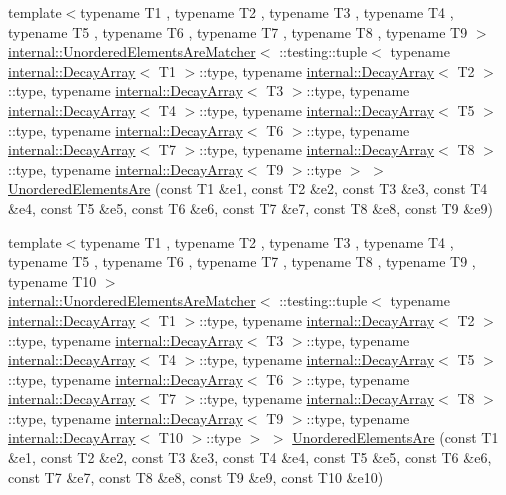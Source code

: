 \begin{DoxyCompactItemize}
\item 
{\footnotesize template$<$typename T1 , typename T2 , typename T3 , typename T4 , typename T5 , typename T6 , typename T7 , typename T8 , typename T9 $>$ }\\\hyperlink{classtesting_1_1internal_1_1UnorderedElementsAreMatcher}{internal\+::\+Unordered\+Elements\+Are\+Matcher}$<$ \+::testing\+::tuple$<$ typename \hyperlink{structtesting_1_1internal_1_1DecayArray}{internal\+::\+Decay\+Array}$<$ T1 $>$\+::type, typename \hyperlink{structtesting_1_1internal_1_1DecayArray}{internal\+::\+Decay\+Array}$<$ T2 $>$\+::type, typename \hyperlink{structtesting_1_1internal_1_1DecayArray}{internal\+::\+Decay\+Array}$<$ T3 $>$\+::type, typename \hyperlink{structtesting_1_1internal_1_1DecayArray}{internal\+::\+Decay\+Array}$<$ T4 $>$\+::type, typename \hyperlink{structtesting_1_1internal_1_1DecayArray}{internal\+::\+Decay\+Array}$<$ T5 $>$\+::type, typename \hyperlink{structtesting_1_1internal_1_1DecayArray}{internal\+::\+Decay\+Array}$<$ T6 $>$\+::type, typename \hyperlink{structtesting_1_1internal_1_1DecayArray}{internal\+::\+Decay\+Array}$<$ T7 $>$\+::type, typename \hyperlink{structtesting_1_1internal_1_1DecayArray}{internal\+::\+Decay\+Array}$<$ T8 $>$\+::type, typename \hyperlink{structtesting_1_1internal_1_1DecayArray}{internal\+::\+Decay\+Array}$<$ T9 $>$\+::type $>$ $>$ \hyperlink{namespacetesting_a2e03e363e193ef512bf9fa964c484375}{Unordered\+Elements\+Are} (const T1 \&e1, const T2 \&e2, const T3 \&e3, const T4 \&e4, const T5 \&e5, const T6 \&e6, const T7 \&e7, const T8 \&e8, const T9 \&e9)
\item 
{\footnotesize template$<$typename T1 , typename T2 , typename T3 , typename T4 , typename T5 , typename T6 , typename T7 , typename T8 , typename T9 , typename T10 $>$ }\\\hyperlink{classtesting_1_1internal_1_1UnorderedElementsAreMatcher}{internal\+::\+Unordered\+Elements\+Are\+Matcher}$<$ \+::testing\+::tuple$<$ typename \hyperlink{structtesting_1_1internal_1_1DecayArray}{internal\+::\+Decay\+Array}$<$ T1 $>$\+::type, typename \hyperlink{structtesting_1_1internal_1_1DecayArray}{internal\+::\+Decay\+Array}$<$ T2 $>$\+::type, typename \hyperlink{structtesting_1_1internal_1_1DecayArray}{internal\+::\+Decay\+Array}$<$ T3 $>$\+::type, typename \hyperlink{structtesting_1_1internal_1_1DecayArray}{internal\+::\+Decay\+Array}$<$ T4 $>$\+::type, typename \hyperlink{structtesting_1_1internal_1_1DecayArray}{internal\+::\+Decay\+Array}$<$ T5 $>$\+::type, typename \hyperlink{structtesting_1_1internal_1_1DecayArray}{internal\+::\+Decay\+Array}$<$ T6 $>$\+::type, typename \hyperlink{structtesting_1_1internal_1_1DecayArray}{internal\+::\+Decay\+Array}$<$ T7 $>$\+::type, typename \hyperlink{structtesting_1_1internal_1_1DecayArray}{internal\+::\+Decay\+Array}$<$ T8 $>$\+::type, typename \hyperlink{structtesting_1_1internal_1_1DecayArray}{internal\+::\+Decay\+Array}$<$ T9 $>$\+::type, typename \hyperlink{structtesting_1_1internal_1_1DecayArray}{internal\+::\+Decay\+Array}$<$ T10 $>$\+::type $>$ $>$ \hyperlink{namespacetesting_ae0e6c9754b17623a64358da8d38c4d13}{Unordered\+Elements\+Are} (const T1 \&e1, const T2 \&e2, const T3 \&e3, const T4 \&e4, const T5 \&e5, const T6 \&e6, const T7 \&e7, const T8 \&e8, const T9 \&e9, const T10 \&e10)

\end{DoxyCompactItemize}

